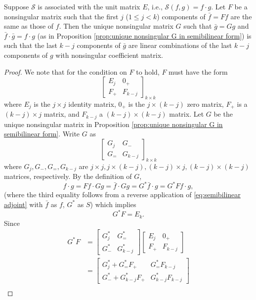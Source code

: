 \documentclass[10.5pt, oneside, a4paper]{article}
\begin{document}
\begin{prop}\label{prop:last k-j components linear combination}
    Suppose $\mathcal{S}$ is associated with the unit matrix $E$, i.e., $\mathcal{S}(f,g)=f\cdot g$. Let $F$ be a nonsingular matrix such that the first $j$ ($1\leq j<k$) components of $\bar{f}=Ff$ are the same as those of $f$. Then the unique nonsingular matrix $G$ such that $\bar{g}=Gg$ and $\bar{f}\cdot \bar{g}=f\cdot g$ (as in Proposition \ref{prop:unique nonsingular G in semibilinear form}) is such that the last $k-j$ components of $\bar{g}$ are linear combinations of the last $k-j$ components of $g$ with nonsingular coefficient matrix.
\end{prop}
{\color{blue}
\begin{proof}
    We note that for the condition on $F$ to hold, $F$ must have the form
\[\begin{bmatrix}E_j & 0_+\\
F_+ & F_{k-j}\end{bmatrix}_{k\times k}\]
where $E_j$ is the $j\times j$ identity matrix, $0_+$ is the $j\times (k-j)$ zero matrix, $F_+$ is a $(k-j)\times j$ matrix, and $F_{k-j}$ a $(k-j)\times (k-j)$ matrix. Let $G$ be the unique nonsingular matrix in Proposition \ref{prop:unique nonsingular G in semibilinear form}. Write $G$ as
\[\begin{bmatrix}G_j & G_-\\
G_= & G_{k-j}\end{bmatrix}_{k\times k}\]
where $G_j, G_-, G_=, G_{k-j}$ are $j\times j, j\times (k-j), (k-j)\times j, (k-j)\times (k-j)$ matrices, respectively. By the definition of $G$,
\[f\cdot g = Ff\cdot Gg = \bar{f}\cdot Gg = G^*\bar{f}\cdot g = G^*Ff\cdot g,\]
(where the third equality follows from a reverse application of \eqref{eq:semibilinear adjoint} with $\bar{f}$ as $f$, $G^*$ as $S$) which implies
\[G^*F = E_k.\]
Since
\begin{align*}
    G^*F &= \begin{bmatrix}
        G^*_j & G^*_=\\
        G^*_- & G^*_{k-j}
    \end{bmatrix}\begin{bmatrix}E_j & 0_+\\
    F_+ & F_{k-j}\end{bmatrix}\\
    &= \begin{bmatrix}
        G^*_j + G^*_= F_+ & G^*_= F_{k-j}\\
        G^*_- + G^*_{k-j} F_+ & G^*_{k-j}F_{k-j}
    \end{bmatrix}\\

\end{align*}
\end{proof}}
\end{document}
